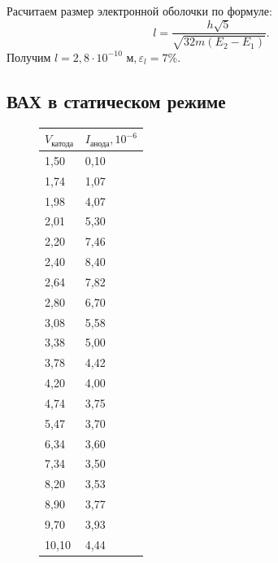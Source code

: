 \documentclass[a4paper,12pt]{article}
\theoremstyle{plain} %
\theoremstyle{definition} %
\theoremstyle{remark} %
\begin{document}
\begin{enumerate}
Расчитаем размер электронной оболочки по формуле:
\[l = \frac{h\sqrt{5}}{\sqrt{32m(E_2-E_1)}}.\]
Получим $l = 2,8 \cdot 10^{-10} \text{ м}, \varepsilon_{l} = 7\%.$

\end{enumerate}

\newpage
\subsection{ВАХ в статическом режиме}
\begin{figure}[h]
\begin{floatrow}
	 \begin{tabular}{|l|l|}
\hline
\rowcolor[HTML]{FFECCB} 
\textbf{$V_\text{катода}$}  & \textbf{$I_\text{анода}, 10^{-6}$}    \\ \hline
1,50  & 0,10    \\ \hline
1,74 & 1,07 \\ \hline
1,98 & 4,07 \\ \hline
2,01 & 5,30  \\ \hline
2,20  & 7,46 \\ \hline
2,40  & 8,40  \\ \hline
2,64 & 7,82 \\ \hline
2,80  & 6,70  \\ \hline
3,08 & 5,58 \\ \hline
3,38 & 5,00 \\ \hline
3,78 & 4,42 \\ \hline
4,20  & 4,00 \\ \hline
4,74 & 3,75 \\ \hline
5,47 & 3,70  \\ \hline
6,34 & 3,60  \\ \hline
7,34 & 3,50  \\ \hline
8,20  & 3,53 \\ \hline
8,90  & 3,77 \\ \hline
9,70  & 3,93 \\ \hline
10,10 & 4,44 \\ \hline
\end{tabular}

\hspace{10ex}


\end{floatrow}
\end{figure}
\end{document}
